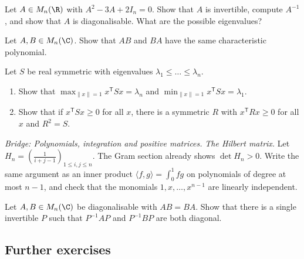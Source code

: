 \begin{exercise}[$\star\star$]\label{ex:annul}
Let $A\in M_n(\R)$ with $A^2-3A+2I_n=0$. Show that $A$ is invertible, compute $A^{-1}$, and show that $A$ is diagonalisable. What are the possible eigenvalues?
\end{exercise}

\begin{exercise}[$\star\star$]\label{ex:abba}
Let $A,B\in M_n(\C)$. Show that $AB$ and $BA$ have the same characteristic polynomial.
\end{exercise}

\begin{exercise}[$\star\star$]\label{ex:rayleigh}
Let $S$ be real symmetric with eigenvalues $\lambda_1\le\dots\le\lambda_n$.
\begin{enumerate}[label=(\alph*)]
\item Show that $\max_{\|x\|=1}x^{\mathsf T}Sx=\lambda_n$ and $\min_{\|x\|=1}x^{\mathsf T}Sx=\lambda_1$.
\item Show that if $x^{\mathsf T}Sx\ge0$ for all $x$, there is a symmetric $R$ with $x^{\mathsf T}Rx\ge0$ for all $x$ and $R^2=S$.
\end{enumerate}
\end{exercise}

\begin{exercise}[$\star\star\star$]\label{ex:hilbert}
\emph{Bridge: Polynomials, integration and positive matrices.}
\emph{The Hilbert matrix.} Let $H_n=\left(\frac1{i+j-1}\right)_{1\le i,j\le n}$. The Gram section already shows $\det H_n>0$. Write the same argument as an inner product $\langle f,g\rangle=\int_0^1 fg$ on polynomials of degree at most $n-1$, and check that the monomials $1,x,\dots,x^{n-1}$ are linearly independent.
\end{exercise}

\begin{exercise}[$\star\star\star$]\label{ex:codiag}
Let $A,B\in M_n(\C)$ be diagonalisable with $AB=BA$. Show that there is a single invertible $P$ such that $P^{-1}AP$ and $P^{-1}BP$ are both diagonal.
\end{exercise}

\subsection*{Further exercises}

